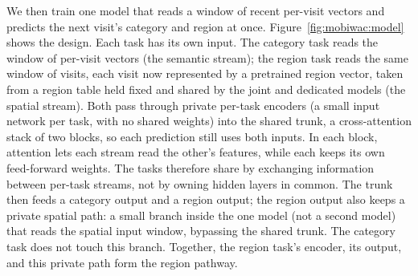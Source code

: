 We then train one model that reads a window of recent per-visit vectors and predicts the next visit's category and region at once. Figure~\ref{fig:mobiwac:model} shows the design. Each task has its own input. The category task reads the window of per-visit vectors (the semantic stream); the region task reads the same window of visits, each visit now represented by a pretrained region vector, taken from a region table held fixed and shared by the joint and dedicated models (the spatial stream). Both pass through private
per-task encoders (a small input network per task, with no shared weights) into the shared trunk, a cross-attention stack of two blocks, so each prediction still uses both inputs. In each block, attention lets each
stream read the other's features, while each keeps its own feed-forward
weights. The tasks therefore share by exchanging information between per-task
streams, not by owning hidden layers in common. The trunk then feeds a category output and a region output; the region output also keeps a private spatial path: a small branch inside the one model (not a second model) that reads the spatial input window, bypassing the shared trunk. The category task does not touch this branch. Together, the region task's encoder, its output, and this private path form the region pathway.

